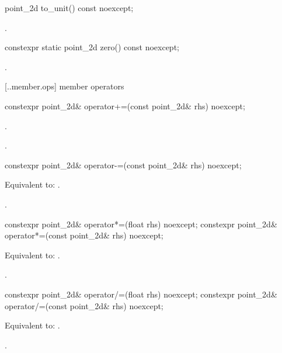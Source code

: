 %
\begin{itemdecl}
point_2d to_unit() const noexcept;
\end{itemdecl}
\begin{itemdescr}
\pnum
\returns
{}.
\end{itemdescr}

%
\begin{itemdecl}
constexpr static point_2d zero() const noexcept;
\end{itemdecl}
\begin{itemdescr}
\pnum
\returns
{}.
\end{itemdescr}

 [\iotwod.\pointtwod.member.ops] { member operators}

%
\begin{itemdecl}
constexpr point_2d& operator+=(const point_2d& rhs) noexcept;
\end{itemdecl}
\begin{itemdescr}
\pnum
\effects
{}.
	
\pnum
\returns
{}.
\end{itemdescr}

%
\begin{itemdecl}
constexpr point_2d& operator-=(const point_2d& rhs) noexcept;
\end{itemdecl}
\begin{itemdescr}
\pnum
\effects
Equivalent to: .

\pnum
\returns
{}.
\end{itemdescr}

%
\begin{itemdecl}
constexpr point_2d& operator*=(float rhs) noexcept;
constexpr point_2d& operator*=(const point_2d& rhs) noexcept;
\end{itemdecl}
\begin{itemdescr}
\pnum
\effects
Equivalent to: .

\pnum
\returns
{}.
\end{itemdescr}

%
\begin{itemdecl}
constexpr point_2d& operator/=(float rhs) noexcept;
constexpr point_2d& operator/=(const point_2d& rhs) noexcept;
\end{itemdecl}
\begin{itemdescr}
\pnum
\effects
Equivalent to: .

\pnum
\returns
{}.
\end{itemdescr}

